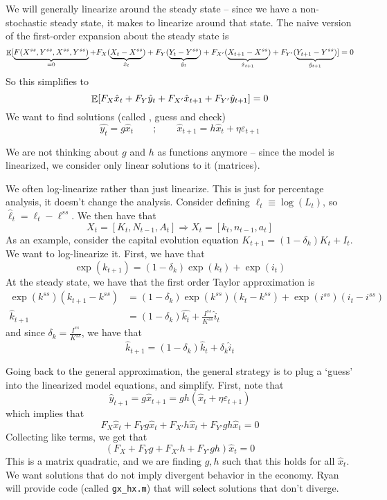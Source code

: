 \documentclass[10pt]{article}
\begin{document}
\begin{algorithm}
	
	  We will generally linearize around the steady state -- since we have a non-stochastic steady state, it makes to linearize around that state. The naive version of the first-order expansion about the steady state is
	\[
	\mathop{\mathbb{E}}[\underbrace{F(X^{ss},Y^{ss},X^{ss},Y^{ss})}_{= 0} + F_X(\underbrace{X_t - X^{ss}}_{\hat{x}_t}) + F_Y(\underbrace{Y_t - Y^{ss}}_{\hat{y}_t}) + F_{X'}(\underbrace{X_{t+1} - X^{ss}}_{\hat{x}_{t+1}}) + F_{Y'}(\underbrace{Y_{t+1} - Y^{ss}}_{\hat{y}_{t+1}})] = 0
	\]
	So this simplifies to
	\[
	\mathop{\mathbb{E}}[ F_X \hat{x}_t + F_Y \hat{y}_t + F_{X'} \hat{x}_{t+1} + F_{Y'} \hat{y}_{t+1}] = 0
	\]
	We want to find solutions (called , \ie guess and check)
	\[
	\hat{y_t} = g\hat{x}_t \qquad ; \qquad \hat{x}_{t+1} = h \hat{x}_t + \eta \varepsilon_{t+1}
	\]
	\begin{remark}
		We are not thinking about $g$ and $h$ as functions anymore -- since the model is linearized, we consider only linear solutions to it (\ie matrices).
	\end{remark}
	\begin{remark}
		We often log-linearize rather than just linearize. This is just for percentage analysis, it doesn't change the analysis. Consider defining $\ell_t \equiv \log(L_t)$, so $\hat{\ell}_t = \ell_t - \ell^{ss}$. We then have that
		\[
		X_t = [K_t,N_{t-1},A_t] \Longrightarrow X_t = [k_t,n_{t-1},a_t]
		\]
		As an example, consider the capital evolution equation $K_{t+1} = (1-\delta_k)K_t + I_t$. We want to log-linearize it. First, we have that
		\[
		\exp(k_{t+1}) = (1-\delta_k) \exp(k_t) + \exp(i_t)
		\]
		At the steady state, we have that the first order Taylor approximation is
		\begin{align*}
			\exp(k^{ss})(k_{t+1} - k^{ss}) &= (1-\delta_k)\exp(k^{ss})(k_t - k^{ss}) + \exp(i^{ss}) (i_t - i^{ss}) \\
			\hat{k}_{t+1} &= (1-\delta_k)\hat{k_t} + \frac{I^{ss}}{K^{ss}}\hat{i}_t
		\end{align*}
		and since $\delta_k = \frac{I^{ss}}{K^{ss}}$, we have that
		\[
		\hat{k}_{t+1} = (1-\delta_k) \hat{k}_t + \delta_k \hat{i}_t
		\]
	\end{remark}
	
	Going back to the general approximation, the general strategy is to plug a `guess' into the linearized model equations, and simplify. First, note that
	\[
	\hat{y}_{t+1} = g\hat{x}_{t+1} = gh(\hat{x}_t + \eta\varepsilon_{t+1})
	\]
	which implies that
	\[
	F_X \hat{x}_t + F_Y g \hat{x}_t + F_{X'} h\hat{x}_t + F_{Y'} gh\hat{x}_t = 0
	\]
	Collecting like terms, we get that
	\[
	(F_X + F_Y g + F_{X'}h + F_{Y'}gh) \hat{x}_t = 0
	\]
	This is a matrix quadratic, and we are finding $g,h$ such that this holds for all $\hat{x}_t$. We want solutions that do not imply divergent behavior in the economy. Ryan will provide code (called \texttt{gx\_hx.m}) that will select solutions that don't diverge.
\end{algorithm}
\end{document}
